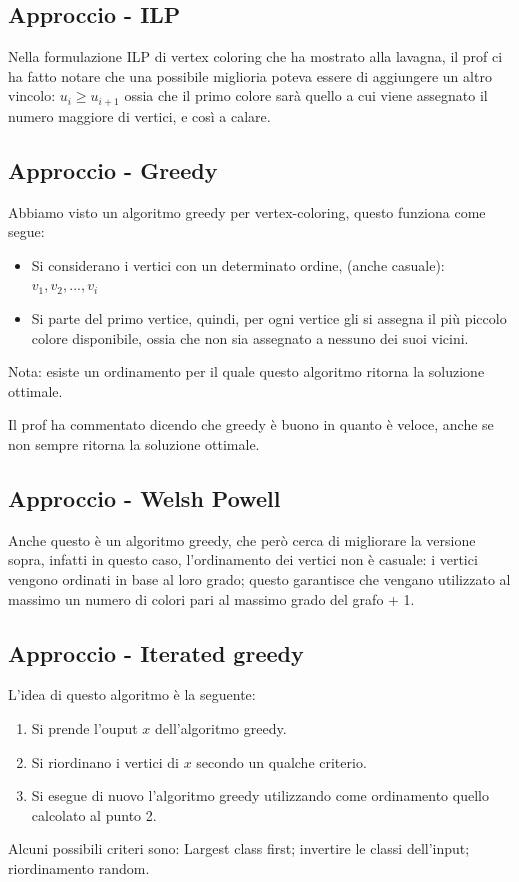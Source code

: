 \documentclass[12pt,a4paper]{article}
\begin{document}
\subsection{Approccio - ILP}
Nella formulazione ILP di vertex coloring che ha mostrato alla lavagna, il prof ci ha fatto notare che una possibile miglioria poteva essere di aggiungere un altro vincolo: $u_i \geq u_{i+1}$ ossia che il primo colore sarà quello a cui viene assegnato il numero maggiore di vertici, e così a calare.

\subsection{Approccio - Greedy}
Abbiamo visto un algoritmo greedy per vertex-coloring, questo funziona come segue:
\begin{itemize}
\item Si considerano i vertici con un determinato ordine, (anche casuale): $v_1, v_2, ... , v_i$
\item Si parte del primo vertice, quindi, per ogni vertice gli si assegna il più piccolo colore disponibile, ossia che non sia assegnato a nessuno dei suoi vicini.
\end{itemize}
Nota: esiste un ordinamento per il quale questo algoritmo ritorna la soluzione ottimale.

Il prof ha commentato dicendo che greedy è buono in quanto è veloce, anche se non sempre ritorna la soluzione ottimale.

\subsection{Approccio - Welsh Powell}
Anche questo è un algoritmo greedy, che però cerca di migliorare la versione sopra, infatti in questo caso, l'ordinamento dei vertici non è casuale: i vertici vengono ordinati in base al loro grado; questo garantisce che vengano utilizzato al massimo un numero di colori pari al massimo grado del grafo + 1.

\subsection{Approccio - Iterated greedy}
L'idea di questo algoritmo è la seguente:
\begin{enumerate}
\item Si prende l'ouput $x$ dell'algoritmo greedy.
\item Si riordinano i vertici di $x$ secondo un qualche criterio.
\item Si esegue di nuovo l'algoritmo greedy utilizzando come ordinamento quello calcolato al punto 2.
\end{enumerate}
Alcuni possibili criteri sono: Largest class first; invertire le classi dell'input; riordinamento random.
\end{document}
